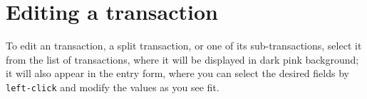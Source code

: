 \section{Editing a transaction\label{transactions-modify}}

To edit an transaction, a split transaction, or one of its sub-transactions, select it from the list of transactions, where it will be displayed in \colorbox[RGB]{245,155,155}{dark pink background}; it will also appear in the entry form, where you can select the desired fields by \texttt{left-click} and modify the values as you see fit.


